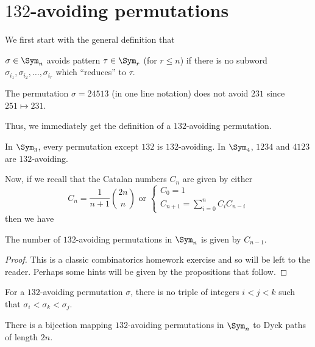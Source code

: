 \documentclass[11pt,leqno,oneside]{amsart}
\numberwithin{thm}{section}
\begin{document}
\section{\(132\)-avoiding permutations}
We first start with the general definition that
\begin{defn}
  \(\sigma \in \Sym_n\) avoids pattern \(\tau \in \Sym_r\) (for \(r
  \leq n\)) if there is no subword \(\sigma_{i_1}, \sigma_{i_2},
  \ldots, \sigma_{i_r}\) which ``reduces'' to \(\tau\).
\end{defn}
\begin{example}
  The permutation \(\sigma = 24513\) (in one line notation) does
  not avoid \(231\) since \(251 \mapsto 231\).
\end{example}
Thus, we immediately get the definition of a \(132\)-avoiding
permutation.
\begin{example}
  In \(\Sym_3\), every permutation except \(132\) is
  \(132\)-avoiding. In \(\Sym_4\), \(1234\) and \(4123\) are
  \(132\)-avoiding. 
\end{example}
Now, if we recall that the Catalan numbers \(C_n\) are given by
either \[
  C_n = \frac{1}{n+1} \binom{2n}{n} \text{ or }
  \begin{cases}
    C_0 = 1 \\
    C_{n+1} = \sum_{i=0}^n C_i C_{n-i}
  \end{cases}
\]
then we have
\begin{thm}
  The number of \(132\)-avoiding permutations in \(\Sym_n\) is given
  by \(C_{n-1}\).
\end{thm}
\begin{proof}
  This is a classic combinatorics homework exercise and so will be
  left to the reader. Perhaps some hints will be given by the
  propositions that follow.
\end{proof}
\begin{lem}
  For  a \(132\)-avoiding
  permutation \(\sigma\), there is no triple of integers \(i < j < k\)
  such that \(\sigma_i < \sigma_k < \sigma_j\).
\end{lem}
\begin{prop}
  There is a bijection mapping \(132\)-avoiding permutations in
  \(\Sym_n\) to Dyck paths of length \(2n\).
\end{prop}
\end{document}
